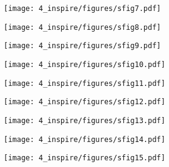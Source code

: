 \begin{figure}
    \centering
    \texttt{[image: 4\_inspire/figures/sfig7.pdf]}
    \caption{}
    \label{fig:c4_sf7}
\end{figure}

\begin{figure}
    \centering
    \texttt{[image: 4\_inspire/figures/sfig8.pdf]}
    \caption{}
    \label{fig:c4_sf8}
\end{figure}

\begin{figure}
    \centering
    \texttt{[image: 4\_inspire/figures/sfig9.pdf]}
    \caption{}
    \label{fig:c4_sf9}
\end{figure}

\begin{figure}
    \centering
    \texttt{[image: 4\_inspire/figures/sfig10.pdf]}
    \caption{}
    \label{fig:c4_sf10}
\end{figure}

\begin{figure}
    \centering
    \texttt{[image: 4\_inspire/figures/sfig11.pdf]}
    \caption{}
    \label{fig:c4_sf11}
\end{figure}

\begin{figure}
    \centering
    \texttt{[image: 4\_inspire/figures/sfig12.pdf]}
    \caption{}
    \label{fig:c4_sf12}
\end{figure}

\begin{figure}
    \centering
    \texttt{[image: 4\_inspire/figures/sfig13.pdf]}
    \caption{}
    \label{fig:c4_sf13}
\end{figure}

\begin{figure}
    \centering
    \texttt{[image: 4\_inspire/figures/sfig14.pdf]}
    \caption{}
    \label{fig:c4_sf14}
\end{figure}

\begin{figure}
    \centering
    \texttt{[image: 4\_inspire/figures/sfig15.pdf]}
    \caption{}
    \label{fig:c4_sf15}
\end{figure}

